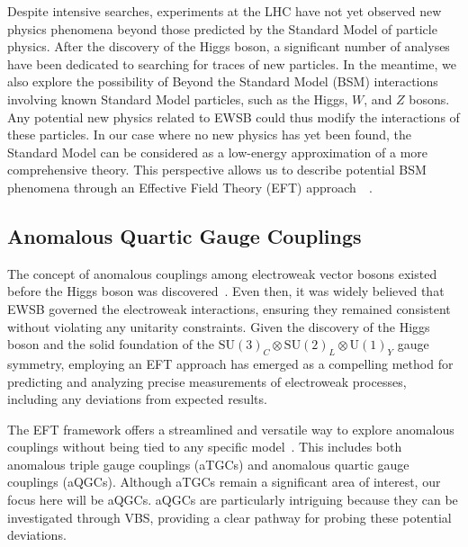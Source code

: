 Despite intensive searches, experiments at the LHC have not yet observed new physics phenomena beyond those predicted by the Standard Model of particle physics.
After the discovery of the Higgs boson, a significant number of analyses have been dedicated to searching for traces of new particles. In the meantime, we also explore the possibility of Beyond the Standard Model (BSM) interactions involving known Standard Model particles, such as the Higgs, $W$, and $Z$ bosons. Any potential new physics related to EWSB could thus modify the interactions of these particles.
In our case where no new physics has yet been found, the Standard Model can be considered as a low-energy approximation of a more comprehensive theory.
This perspective allows us to describe potential BSM phenomena through an Effective Field Theory (EFT)  approach~\cite{Weinberg:1978kz}~\cite{RevModPhys.52.515}.

\subsection{Anomalous Quartic Gauge Couplings}
\label{Anomalous_Quartic_Gauge_Couplings}

The concept of anomalous couplings among electroweak vector bosons existed before the Higgs boson was discovered~\cite{GaemersGounaris1979}. Even then, it was widely believed that EWSB governed the electroweak interactions, ensuring they remained consistent without violating any unitarity constraints.
Given the discovery of the Higgs boson and the solid foundation of the $\mathrm{SU}(3)_C \otimes \mathrm{SU}(2)_L \otimes \mathrm{U}(1)_Y$ gauge symmetry, employing an EFT approach has emerged as a compelling method for predicting and analyzing precise measurements of electroweak processes, including any deviations from expected results.

The EFT framework offers a streamlined and versatile way to explore anomalous couplings without being tied to any specific model~\cite{Degrande_2013}. This includes both anomalous triple gauge couplings (aTGCs) and anomalous quartic gauge couplings (aQGCs). Although aTGCs remain a significant area of interest, our focus here will be aQGCs. aQGCs are particularly intriguing because they can be investigated through VBS, providing a clear pathway for probing these potential deviations.

